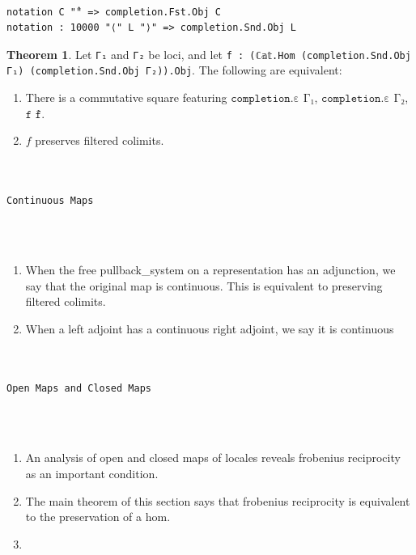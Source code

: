 \documentclass{book}
\theoremstyle{definition}
\newtheorem{theorem}{Theorem}
\newcounter{lcounter}
\renewcommand{\chapter}[1]{
\newpage
{
\Huge 
\begin{center}
\ \\
\ \\
\thispagestyle{empty}
\texttt{#1}
\end{center}}
\ \\
\ \\
}
\begin{document}
\begin{center}
\begin{tcolorbox}[width=5in,colback={white},title={\begin{center}\texttt{Lean \thelcounter} \addtocounter{lcounter}{1}  \end{center}},colbacktitle=Blue,coltitle=black]
\begin{verbatim}

notation C "̂" => completion.Fst.Obj C
notation : 10000 "⟨" L "⟩" => completion.Snd.Obj L

\end{verbatim}
\end{tcolorbox}
\end{center}

\begin{theorem}
Let \texttt{Γ₁} and \texttt{Γ₂} be loci, and let \texttt{f : (ℂ𝕒𝕥.Hom (completion.Snd.Obj Γ₁) (completion.Snd.Obj Γ₂)).Obj}. The following are equivalent:
\begin{enumerate}
\item There is a commutative square featuring $\texttt{completion.ε Γ₁}$, $\texttt{completion.ε Γ₂}$, $\texttt{f}$ $\texttt{f̂}$.
\item $f$ preserves filtered colimits.
\end{enumerate}
\end{theorem}

\chapter{Continuous Maps}

\begin{enumerate}
\item When the free pullback_system on a representation has an adjunction, we say that the original map is continuous. This is equivalent to preserving filtered colimits.
\item When a left adjoint has a continuous right adjoint, we say it is continuous
\end{enumerate}

\chapter{Open Maps and Closed Maps}

\begin{enumerate}
\item An analysis of open and closed maps of locales reveals frobenius reciprocity as an important condition.
\item The main theorem of this section says that frobenius reciprocity is equivalent to the preservation of a hom.
\item 
\end{enumerate}
\end{document}
